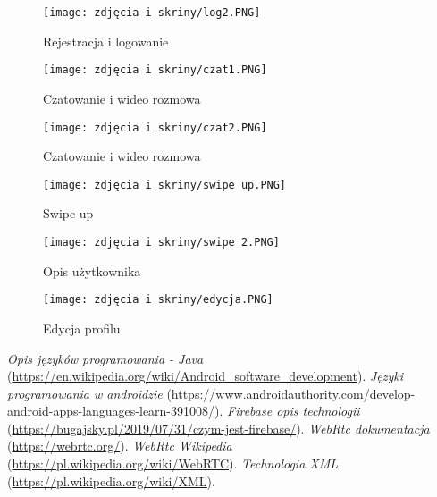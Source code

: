 \documentclass[12pt,a4paper]{article}
\begin{document}
\begin{figure}[H]
\centering
\texttt{[image: zdjęcia i skriny/log2.PNG]}
\caption{Rejestracja i logowanie}
\end{figure}


\begin{figure}[H]
\centering
\texttt{[image: zdjęcia i skriny/czat1.PNG]}
\caption{Czatowanie i wideo rozmowa}
\end{figure}

\begin{figure}[H]
\centering
\texttt{[image: zdjęcia i skriny/czat2.PNG]}
\caption{Czatowanie i wideo rozmowa}
\end{figure}

\begin{figure}[H]
\centering
\texttt{[image: zdjęcia i skriny/swipe up.PNG]}
\caption{Swipe up}
\end{figure}

\begin{figure}[H]
\centering
\texttt{[image: zdjęcia i skriny/swipe 2.PNG]}
\caption{Opis użytkownika}
\end{figure}


\begin{figure}[H]
\centering
\texttt{[image: zdjęcia i skriny/edycja.PNG]}
\caption{Edycja profilu}
\end{figure}

\newpage
\begin{thebibliography}{9}
 {\it Opis języków programowania - Java} (\url{https://en.wikipedia.org/wiki/Android_software_development}).
 {\it Języki programowania w androidzie} (\url{https://www.androidauthority.com/develop-android-apps-languages-learn-391008/}).
 {\it Firebase opis technologii} (\url{https://bugajsky.pl/2019/07/31/czym-jest-firebase/}).
 {\it WebRtc dokumentacja} (\url{https://webrtc.org/}).
 {\it WebRtc Wikipedia} (\url{https://pl.wikipedia.org/wiki/WebRTC}).
 {\it Technologia XML} (\url{https://pl.wikipedia.org/wiki/XML}).
\end{thebibliography}
\end{document}
